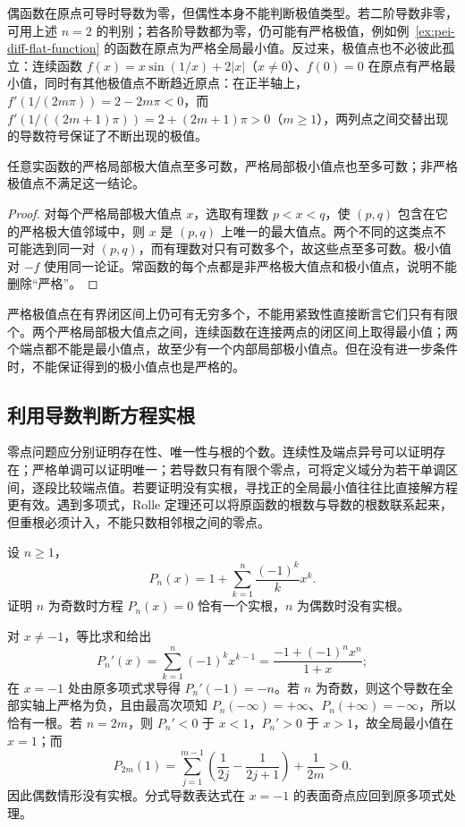 偶函数在原点可导时导数为零，但偶性本身不能判断极值类型。若二阶导数非零，可用上述 $n=2$ 的判别；若各阶导数都为零，仍可能有严格极值，例如例~\ref{ex:pei-diff-flat-function} 的函数在原点为严格全局最小值。反过来，极值点也不必彼此孤立：连续函数 $f(x)=x\sin(1/x)+2|x|$（$x\ne0$）、$f(0)=0$ 在原点有严格最小值，同时有其他极值点不断趋近原点：在正半轴上，$f'(1/(2m\pi))=2-2m\pi<0$，而 $f'(1/((2m+1)\pi))=2+(2m+1)\pi>0$（$m\ge1$），两列点之间交替出现的导数符号保证了不断出现的极值。

\begin{proposition}
\label{prop:pei-diff-countable-strict-extrema}
任意实函数的严格局部极大值点至多可数，严格局部极小值点也至多可数；非严格极值点不满足这一结论。
\end{proposition}
\begin{proof}
对每个严格局部极大值点 $x$，选取有理数 $p<x<q$，使 $(p,q)$ 包含在它的严格极大值邻域中，则 $x$ 是 $(p,q)$ 上唯一的最大值点。两个不同的这类点不可能选到同一对 $(p,q)$，而有理数对只有可数多个，故这些点至多可数。极小值对 $-f$ 使用同一论证。常函数的每个点都是非严格极大值点和极小值点，说明不能删除“严格”。
\end{proof}

\begin{remark}
严格极值点在有界闭区间上仍可有无穷多个，不能用紧致性直接断言它们只有有限个。两个严格局部极大值点之间，连续函数在连接两点的闭区间上取得最小值；两个端点都不能是最小值点，故至少有一个内部局部极小值点。但在没有进一步条件时，不能保证得到的极小值点也是严格的。
\end{remark}

\subsection{利用导数判断方程实根}

零点问题应分别证明存在性、唯一性与根的个数。连续性及端点异号可以证明存在；严格单调可以证明唯一；若导数只有有限个零点，可将定义域分为若干单调区间，逐段比较端点值。若要证明没有实根，寻找正的全局最小值往往比直接解方程更有效。遇到多项式，Rolle 定理还可以将原函数的根数与导数的根数联系起来，但重根必须计入，不能只数相邻根之间的零点。

\begin{example}
\label{ex:pei-diff-alternating-polynomial-roots}
设 $n\ge1$，
\[
 P_n(x)=1+\sum_{k=1}^n\frac{(-1)^k}{k}x^k.
\]
证明 $n$ 为奇数时方程 $P_n(x)=0$ 恰有一个实根，$n$ 为偶数时没有实根。
\end{example}
\begin{solve}
对 $x\ne-1$，等比求和给出
\[
 P_n'(x)=\sum_{k=1}^n(-1)^kx^{k-1}
        =\frac{-1+(-1)^n x^n}{1+x};
\]
在 $x=-1$ 处由原多项式求导得 $P_n'(-1)=-n$。若 $n$ 为奇数，则这个导数在全部实轴上严格为负，且由最高次项知 $P_n(-\infty)=+\infty$、$P_n(+\infty)=-\infty$，所以恰有一根。若 $n=2m$，则 $P_n'<0$ 于 $x<1$，$P_n'>0$ 于 $x>1$，故全局最小值在 $x=1$；而
\[
 P_{2m}(1)=\sum_{j=1}^{m-1}\left(\frac1{2j}-\frac1{2j+1}\right)
                  +\frac1{2m}>0.
\]
因此偶数情形没有实根。分式导数表达式在 $x=-1$ 的表面奇点应回到原多项式处理。
\end{solve}

